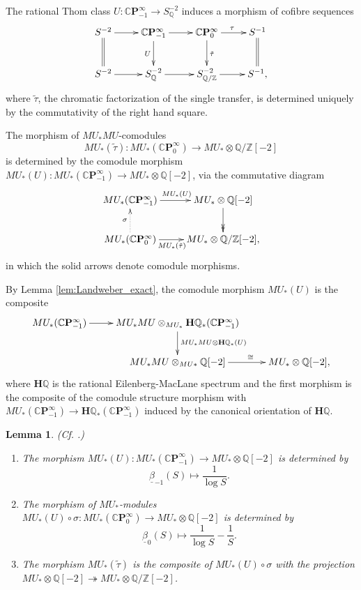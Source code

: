 \documentclass[10pt,a4paper]{amsart}
\newtheorem{lem}[thm]{Lemma}
\theoremstyle{definition}
\theoremstyle{remark}
\newcommand{\qz}{{\rat/\zed}}
\newcommand{\zed}{\mathbb{Z}}
\newcommand{\rat}{\mathbb{Q}}
\newcommand{\hq}{\mathbf{H}\mathbb{Q}}
\newcommand{\cp}{\mathbb{C} \mathbf{P}^\infty}
\begin{document}
The rational Thom class $U : \cp_{-1}\rightarrow S^{-2}_\rat$ induces a
morphism of cofibre sequences
\begin{eqnarray}
 \label{eqn:tau-tilde}
\xymatrix{
S^{-2}
\ar[r]
\ar@{=}[d]
&
\cp_{-1}
\ar[r]
\ar[d]_U
&
\cp_0
\ar[r]^\tau
\ar[d]^{\tilde{\tau}}
&
S^{-1}
\ar@{=}[d]
\\
S^{-2}
\ar[r]
&S^{-2}_\rat
\ar[r]
&
S^{-2}
_\qz
\ar[r]
&
S ^{-1},
}
\end{eqnarray}
where $\tilde{\tau}$, the chromatic factorization of the single transfer, is
determined uniquely by the commutativity of the right hand square.


The morphism   of $MU_*MU$-comodules
\[
	MU_* (\tilde{\tau})
:
MU_* (\cp_0)
\rightarrow
MU_* \otimes \qz [-2]
\]
is determined by the comodule morphism $MU_*(U) : MU_* (\cp_{-1})
\rightarrow
MU_* \otimes \rat [-2]$, via the commutative diagram
\begin{eqnarray}
\label{eqn:U-sigma}
	\xymatrix{
MU_* (\cp_{-1})
\ar[r]^{MU_*(U)}
&
MU_* \otimes \rat [-2]
\ar@{->>}[d]
\\
MU_* (\cp_0)
\ar@{.>}[u]^\sigma
\ar[r]_(.45){MU_* (\tilde{\tau}) }
&
MU_* \otimes \qz [-2],
}
\end{eqnarray}
in which the solid arrows denote  comodule morphisms.

By Lemma \ref{lem:Landweber_exact}, the comodule morphism $MU_*(U)$ is the composite
\[
\xymatrix{
	MU_* (\cp_{-1})
\ar[r]
&
MU_*MU \otimes _{MU_*} \hq_*(\cp_{-1})
\ar[d]^{MU_*MU \otimes \hq_*(U)}
\\
&
MU_*MU \otimes _{MU*} \rat [-2]
\ar[r]^(.6)\cong
&
MU_* \otimes \rat [-2],
}
\]
where $\hq$ is the rational Eilenberg-MacLane spectrum and the first morphism is the composite of the comodule structure morphism with  $MU_* (\cp_{-1} ) \rightarrow \hq_* (\cp_{-1})$ induced by the canonical orientation of $\hq$.

\begin{lem}(Cf. \cite[Theorem 3.9]{miller}.)
	\label{lem:MUThom}
	\begin{enumerate}
		\item
		The morphism $MU_* (U) :MU_* (\cp_{-1}) \rightarrow MU_* \otimes \rat [-2]$
is determined by
\[
	\underline{\beta}_{-1} (S)
\mapsto
\frac{1}{\log S}.
\]
\item
The morphism of $MU_*$-modules $MU_* (U) \circ \sigma : MU_* (\cp_0 ) \rightarrow MU_* \otimes \rat [-2]$
 is determined by
\[
	\underline{\beta}_{0} (S)
\mapsto
\frac{1}{\log S} - \frac{1}{S}.
\]
\item
The  morphism $MU_* (\tilde{\tau}) $ is the composite of $MU_*(U) \circ \sigma$ with the projection $MU_* \otimes \rat [-2]\twoheadrightarrow MU_* \otimes \qz[-2]$.
\end{enumerate}



\end{lem}
\end{document}
